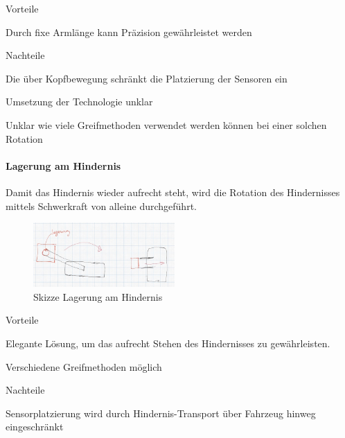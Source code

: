 \documentclass[../main.tex]{subfiles}
\begin{document}
\begin{minipage}[t]{0.48\textwidth}
    \begin{items}
          \item [Vorteile]
          \item Durch fixe Armlänge kann Präzision gewährleistet werden
    \end{items}
\end{minipage}
\hfill
\begin{minipage}[t]{0.48\textwidth}
    \begin{items}
          \item [Nachteile]
          \item Die über Kopfbewegung schränkt die Platzierung der Sensoren ein
          \item Umsetzung der Technologie unklar
          \item Unklar wie viele Greifmethoden verwendet werden können bei einer solchen Rotation
    \end{items}
\end{minipage}
\newpage
\paragraph{Lagerung am Hindernis}
Damit das Hindernis wieder aufrecht steht, wird die Rotation des Hindernisses mittels Schwerkraft von alleine durchgeführt.

\begin{figure}[H]
        \centering
        \includegraphics[width=0.48\textwidth]{img/technologierecherche/Rotation/ueberkopf_objekt_gelagert.jpg}
        \caption{Skizze Lagerung am Hindernis} 
        \label{img:tech_ueberkopf_objekt_gelagert}
\end{figure}

\begin{minipage}[t]{0.48\textwidth}
    \begin{items}
          \item [Vorteile]
          \item Elegante Lösung, um das aufrecht Stehen des Hindernisses zu gewährleisten.
          \item Verschiedene Greifmethoden möglich
    \end{items}
\end{minipage}
\hfill
\begin{minipage}[t]{0.48\textwidth}
    \begin{items}
          \item [Nachteile]
          \item Sensorplatzierung wird durch Hindernis-Transport über Fahrzeug hinweg eingeschränkt
          
    \end{items}
\end{minipage}
\newpage
\end{document}
